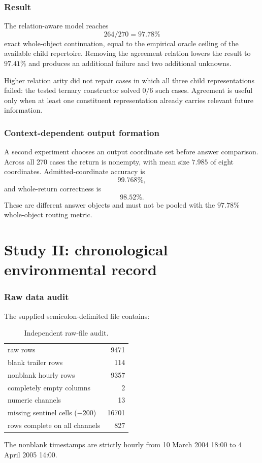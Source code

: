 \documentclass[11pt,a4paper]{article}
\begin{document}
\section{Result}
The relation-aware model reaches
\begin{equation}
\boxed{264/270=97.78\%}
\end{equation}
exact whole-object continuation, equal to the empirical oracle ceiling of the available child repertoire. Removing the agreement relation lowers the result to $97.41\%$ and produces an additional failure and two additional unknowns.

Higher relation arity did not repair cases in which all three child representations failed: the tested ternary constructor solved $0/6$ such cases. Agreement is useful only when at least one constituent representation already carries relevant future information.

\section{Context-dependent output formation}
A second experiment chooses an output coordinate set before answer comparison. Across all 270 cases the return is nonempty, with mean size $7.985$ of eight coordinates. Admitted-coordinate accuracy is
\begin{equation}
99.768\%,
\end{equation}
and whole-return correctness is
\begin{equation}
98.52\%.
\end{equation}
These are different answer objects and must not be pooled with the $97.78\%$ whole-object routing metric.

\part{Study II: chronological environmental record}
\section{Raw data audit}
The supplied semicolon-delimited file contains:
\begin{table}[H]\centering
\caption{Independent raw-file audit.}
\begin{tabular}{lr}
\toprule
raw rows & 9471\\
blank trailer rows & 114\\
nonblank hourly rows & 9357\\
completely empty columns & 2\\
numeric channels & 13\\
missing sentinel cells ($-200$) & 16701\\
rows complete on all channels & 827\\
\bottomrule
\end{tabular}
\end{table}
The nonblank timestamps are strictly hourly from 10 March 2004 18:00 to 4 April 2005 14:00.
\end{document}
